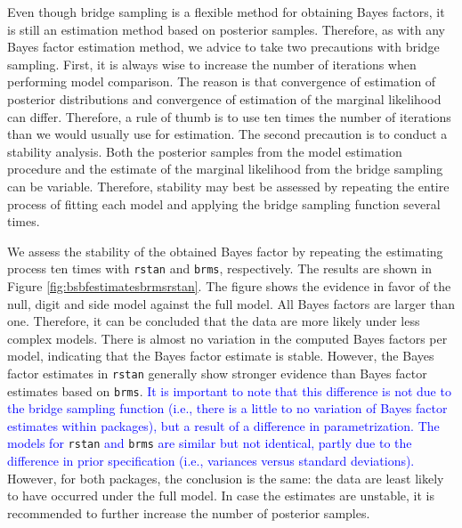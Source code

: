 \documentclass[
  english,
  doc,floatsintext]{apa6}
\newenvironment{Shaded}{\begin{snugshade}}{\end{snugshade}}
\newcommand{\FunctionTok}[1]{\textcolor[rgb]{0.00,0.00,0.00}{#1}}
\newcommand{\NormalTok}[1]{#1}
\newcommand{\SpecialCharTok}[1]{\textcolor[rgb]{0.00,0.00,0.00}{#1}}
\begin{document}
\scriptsize

\begin{Shaded}
\end{Shaded}

\normalsize

Even though bridge sampling is a flexible method for obtaining Bayes factors, it is still an estimation method based on posterior samples. Therefore, as with any Bayes factor estimation method, we advice to take two precautions with bridge sampling. First, it is always wise to increase the number of iterations when performing model comparison. The reason is that convergence of estimation of posterior distributions and convergence of estimation of the marginal likelihood can differ. Therefore, a rule of thumb is to use ten times the number of iterations than we would usually use for estimation. The second precaution is to conduct a stability analysis. Both the posterior samples from the model estimation procedure and the estimate of the marginal likelihood from the bridge sampling can be variable. Therefore, stability may best be assessed by repeating the entire process of fitting each model and applying the bridge sampling function several times.

We assess the stability of the obtained Bayes factor by repeating the estimating process ten times with \texttt{rstan} and \texttt{brms}, respectively. The results are shown in Figure \ref{fig:bsbfestimatesbrmsrstan}. The figure shows the evidence in favor of the null, digit and side model against the full model. All Bayes factors are larger than one. Therefore, it can be concluded that the data are more likely under less complex models. There is almost no variation in the computed Bayes factors per model, indicating that the Bayes factor estimate is stable. However, the Bayes factor estimates in \texttt{rstan} generally show stronger evidence than Bayes factor estimates based on \texttt{brms}. \textcolor{blue}{It is important to note that this difference is not due to the bridge sampling function (i.e., there is a little to no variation of Bayes factor estimates within packages), but a result of a difference in parametrization. The models for} \texttt{rstan} \textcolor{blue}{and} \texttt{brms} \textcolor{blue}{are similar but not identical, partly due to the difference in prior specification (i.e., variances versus standard deviations).} However, for both packages, the conclusion is the same: the data are least likely to have occurred under the full model. In case the estimates are unstable, it is recommended to further increase the number of posterior samples.
\end{document}
